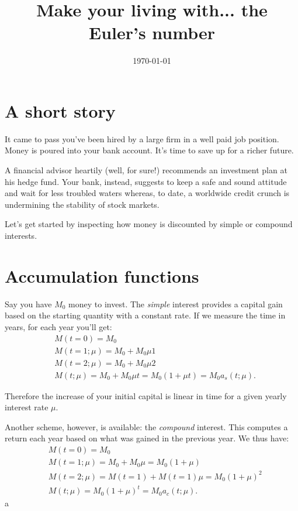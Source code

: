 \documentclass{article}
\title{Make your living with... the Euler's number}
\author{}
\date{\today}
\begin{document}
\maketitle

\section{A short story}
It came to pass you've been hired by a large firm in a well paid job position. Money is poured into your bank account. It's time to save up for a richer future.

A financial advisor heartily (well, for sure!) recommends an investment plan at his hedge fund. Your bank, instead, suggests to keep a safe and sound attitude and wait for less troubled waters whereas, to date, a worldwide credit crunch is undermining the stability of stock markets.

Let's get started by inspecting how money is discounted by simple or compound interests.

\section{Accumulation functions}

Say you have $M_0$ money to invest. The \emph{simple} interest provides a capital gain based on the starting quantity with a constant rate. If we measure the time in years, for each year you'll get:
\begin{align}
&M(t=0) = M_0\\
&M(t=1; \mu) = M_0 + M_0\mu 1\\
&M(t=2; \mu) = M_0 + M_0\mu 2\\
&M(t; \mu) = M_0 + M_0\mu t = M_0 (1+\mu t) = M_0 a_s(t; \mu).
\end{align}

Therefore the increase of your initial capital is linear in time for a given yearly interest rate $\mu$.

Another scheme, however, is available: the \emph{compound} interest. This computes a return each year based on what was gained in the previous year. We thus have:
\begin{align}
&M(t=0) = M_0\\
&M(t=1; \mu) = M_0 + M_0\mu = M_0 (1+\mu)\\
&M(t=2; \mu) = M(t=1) + M(t=1)\mu = M_0 (1+\mu)^2\\
&M(t; \mu) = M_0 (1+\mu)^t = M_0 a_c(t; \mu).
\end{align}a
\end{document}
